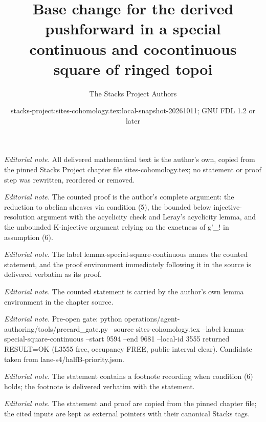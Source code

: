 \documentclass[10pt,a4paper]{amsart}
\title{Base change for the derived pushforward in a special continuous and cocontinuous square of ringed topoi}
\author{The Stacks Project Authors}
\date{stacks-project:sites-cohomology.tex:local-snapshot-20261011; GNU FDL 1.2 or later}
\theoremstyle{plain}
\theoremstyle{definition}
\theoremstyle{remark}
\numberwithin{equation}{subsection}
\begin{document}
\maketitle
\noindent\textit{Editorial note.} All delivered mathematical text is the author's own, copied from the pinned Stacks Project chapter file sites-cohomology.tex; no statement or proof step was rewritten, reordered or removed.\par\medskip
\noindent\textit{Editorial note.} The counted proof is the author's complete argument: the reduction to abelian sheaves via condition (5), the bounded below injective-resolution argument with the acyclicity check and Leray's acyclicity lemma, and the unbounded K-injective argument relying on the exactness of g'\_! in assumption (6).\par\medskip
\noindent\textit{Editorial note.} The label lemma-special-square-continuous names the counted statement, and the proof environment immediately following it in the source is delivered verbatim as its proof.\par\medskip
\noindent\textit{Editorial note.} The counted statement is carried by the author's own lemma environment in the chapter source.\par\medskip
\noindent\textit{Editorial note.} Pre-open gate: python operations/agent-authoring/tools/precard\_gate.py --source sites-cohomology.tex --label lemma-special-square-continuous --start 9594 --end 9681 --local-id 3555 returned RESULT=OK (L3555 free, occupancy FREE, public interval clear). Candidate taken from lane-s4/halfB-priority.json.\par\medskip
\noindent\textit{Editorial note.} The statement contains a footnote recording when condition (6) holds; the footnote is delivered verbatim with the statement.\par\medskip
\noindent\textit{Editorial note.} The statement and proof are copied from the pinned chapter file; the cited inputs are kept as external pointers with their canonical Stacks tags.\par\medskip
\end{document}
